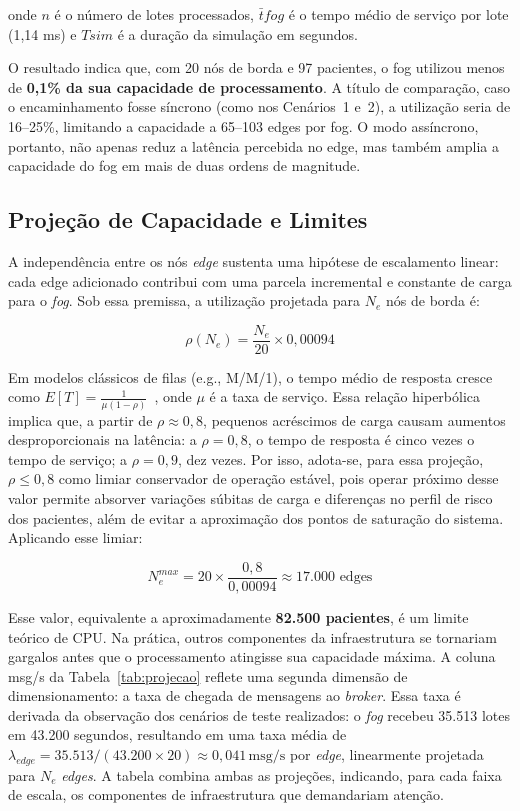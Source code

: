 \documentclass[twoside,english,brazilian]{UNISINOSmonografia}
\begin{document}
\noindent onde $n$ é o número de lotes processados, $\bar{t}{fog}$ é o tempo médio de serviço por lote (1,14 ms) e $T{sim}$ é a duração da simulação em segundos.

O resultado indica que, com 20 nós de borda e 97 pacientes, o fog utilizou menos de \textbf{0,1\% da sua capacidade de processamento}. A título de comparação, caso o encaminhamento fosse síncrono (como nos Cenários~1 e~2), a utilização seria de 16–25\%, limitando a capacidade a 65–103 edges por fog. O modo assíncrono, portanto, não apenas reduz a latência percebida no edge, mas também amplia a capacidade do fog em mais de duas ordens de magnitude.

\subsection{Projeção de Capacidade e Limites}
A independência entre os nós \textit{edge} sustenta uma hipótese de escalamento linear: cada edge adicionado contribui com uma parcela incremental e constante de carga para o \textit{fog}. Sob essa premissa, a utilização projetada para $N_e$ nós de borda é:

\begin{equation}
\rho(N_e) = \frac{N_e}{20} \times 0{,}00094
\label{eq:rho_ne}
\end{equation}

Em modelos clássicos de filas (e.g., M/M/1), o tempo médio de resposta cresce como $E[T] = \frac{1}{\mu(1-\rho)}$~\cite{Kleinrock1975,HarcholBalter2013}, onde $\mu$ é a taxa de serviço. Essa relação hiperbólica implica que, a partir de $\rho \approx 0{,}8$, pequenos acréscimos de carga causam aumentos desproporcionais na latência: a $\rho = 0{,}8$, o tempo de resposta é cinco vezes o tempo de serviço; a $\rho = 0{,}9$, dez vezes. Por isso, adota-se, para essa projeção, $\rho \leq 0{,}8$ como limiar conservador de operação estável, pois operar próximo desse valor permite absorver variações súbitas de carga e diferenças no perfil de risco dos pacientes, além de evitar a aproximação dos pontos de saturação do sistema. Aplicando esse limiar:

\begin{equation}
N_e^{max} = 20 \times \frac{0{,}8}{0{,}00094} \approx 17.000 \text{ edges}
\label{eq:nemax}
\end{equation}

Esse valor, equivalente a aproximadamente \textbf{82.500 pacientes}, é um limite teórico de CPU. Na prática, outros componentes da infraestrutura se tornariam gargalos antes que o processamento atingisse sua capacidade máxima. A coluna msg/s da Tabela~\ref{tab:projecao} reflete uma segunda dimensão de dimensionamento: a taxa de chegada de mensagens ao \textit{broker}. Essa taxa é derivada da observação dos cenários de teste realizados: o \textit{fog} recebeu 35.513 lotes em 43.200 segundos, resultando em uma taxa média de $\lambda_{edge} = 35.513 / (43.200 \times 20) \approx 0{,}041\,\text{msg/s}$ por \textit{edge}, linearmente projetada para $N_e$ \textit{edges}. A tabela combina ambas as projeções, indicando, para cada faixa de escala, os componentes de infraestrutura que demandariam atenção.
\end{document}
